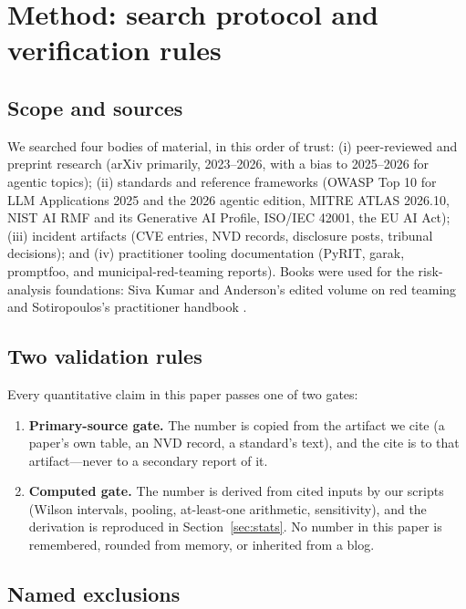 \section{Method: search protocol and verification rules}\label{sec:method}

\subsection{Scope and sources}

We searched four bodies of material, in this order of trust: (i) peer-reviewed and
preprint research (arXiv primarily, 2023--2026, with a bias to 2025--2026 for
agentic topics); (ii) standards and reference frameworks (OWASP Top 10 for LLM
Applications 2025 and the 2026 agentic edition, MITRE ATLAS 2026.10, NIST AI RMF
and its Generative AI Profile, ISO/IEC 42001, the EU AI Act); (iii) incident
artifacts (CVE entries, NVD records, disclosure posts, tribunal decisions); and
(iv) practitioner tooling documentation (PyRIT, garak, promptfoo, and
municipal-red-teaming reports). Books were used for the risk-analysis foundations:
Siva Kumar and Anderson's edited volume on red teaming \cite{sivakumar-anderson}
and Sotiropoulos's practitioner handbook \cite{sotiropoulos}.

\subsection{Two validation rules}

Every quantitative claim in this paper passes one of two gates:

\begin{enumerate}[itemsep=2pt, topsep=4pt]
  \item \textbf{Primary-source gate.} The number is copied from the artifact we
        cite (a paper's own table, an NVD record, a standard's text), and the cite
        is to that artifact---never to a secondary report of it.
  \item \textbf{Computed gate.} The number is derived from cited inputs by our
        scripts (Wilson intervals, pooling, at-least-one arithmetic,
        sensitivity), and the
        derivation is reproduced in Section~\ref{sec:stats}. No number in this
        paper is remembered, rounded from memory, or inherited from a blog.
\end{enumerate}

\subsection{Named exclusions}\label{sec:exclusions}

